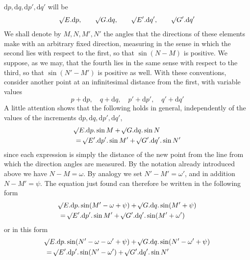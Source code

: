 %
\(\mathrm{d}p,\mathrm{d}q,\mathrm{d}p',\mathrm{d}q'\) will be
\[
\mathord{{}^{}\!\surd}E\mathord{.}\mathrm{d}p,\qquad\mathord{{}^{}\!\surd}G\mathord{.}\mathrm{d}q,\qquad\mathord{{}^{}\!\surd}E'\mathord{.}\mathrm{d}q',\qquad\mathord{{}^{}\!\surd}G'\mathord{.}\mathrm{d}q'
\]
We shall denote by \(M,N,M',N'\) the angles that the directions of these elements make with an arbitrary fixed direction, measuring in the sense in which the second lies with respect to the first, so that \(\sin(N-M)\) is positive. We suppose, as we may, that the fourth lies in the same sense with respect to the third, so that \(\sin(N'-M')\) is positive as well. With these conventions, consider another point at an infinitesimal distance from the first, with variable values
\[
p+\mathrm{d}p,\quad q+\mathrm{d}q,\quad p'+\mathrm{d}p',\quad q'+\mathrm{d}q'
\]
A little attention shows that the following holds in general, independently of the values of the increments \(\mathrm{d}p,\mathrm{d}q,\mathrm{d}p',\mathrm{d}q'\),
\[
\begin{aligned}
&\mathord{{}^{}\!\surd}E\mathord{.}\mathrm{d}p\mathord{.}\sin M+\mathord{{}^{}\!\surd}G\mathord{.}\mathrm{d}q\mathord{.}\sin N\\
&=\mathord{{}^{}\!\surd}E'\mathord{.}\mathrm{d}p'\mathord{.}\sin M'+\mathord{{}^{}\!\surd}G'\mathord{.}\mathrm{d}q'\mathord{.}\sin N'
\end{aligned}
\]
since each expression is simply the distance of the new point from the line from which the direction angles are measured. By the notation already introduced above we have \(N-M=\omega\). By analogy we set \(N'-M'=\omega'\), and in addition \(N-M'=\psi\). The equation just found can therefore be written in the following form
\[
\begin{aligned}
&\mathord{{}^{}\!\surd}E\mathord{.}\mathrm{d}p\mathord{.}\sin(M'-\omega+\psi)+\mathord{{}^{}\!\surd}G\mathord{.}\mathrm{d}q\mathord{.}\sin(M'+\psi)\\
&=\mathord{{}^{}\!\surd}E'\mathord{.}\mathrm{d}p'\mathord{.}\sin M'+\mathord{{}^{}\!\surd}G'\mathord{.}\mathrm{d}q'\mathord{.}\sin(M'+\omega')
\end{aligned}
\]
or in this form
\[
\begin{aligned}
&\mathord{{}^{}\!\surd}E\mathord{.}\mathrm{d}p\mathord{.}\sin(N'-\omega-\omega'+\psi)+\mathord{{}^{}\!\surd}G\mathord{.}\mathrm{d}q\mathord{.}\sin(N'-\omega'+\psi)\\
&=\mathord{{}^{}\!\surd}E'\mathord{.}\mathrm{d}p'\mathord{.}\sin(N'-\omega')+\mathord{{}^{}\!\surd}G'\mathord{.}\mathrm{d}q'\mathord{.}\sin N'
\end{aligned}
\]

